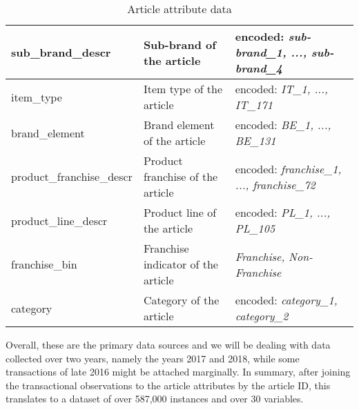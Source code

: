 \begin{table}[H]
\begin{adjustbox}{max width=\textwidth}
\begin{tabular}{|l|l|l|}
sub\_brand\_descr         & Sub-brand of the article                               & encoded: \textit{sub-brand\_1, ..., sub-brand\_4 }     \\ \hline
item\_type                & Item type of the article                               & encoded: \textit{IT\_1, ..., IT\_171 }                 \\ \hline
brand\_element            & Brand element of the article                           & encoded: \textit{BE\_1, ..., BE\_131 }                   \\ \hline
product\_franchise\_descr & Product franchise of the article                       & encoded: \textit{franchise\_1, ..., franchise\_72}     \\ \hline
product\_line\_descr      & Product line of the article                            & encoded: \textit{PL\_1, ..., PL\_105 }                 \\ \hline
franchise\_bin            & Franchise indicator of the article                     &\textit{Franchise, Non-Franchise }                     \\ \hline
category                  & Category of the article                                & encoded: \textit{category\_1, category\_2}             \\ \hline
\end{tabular}
\end{adjustbox}
\caption{Article attribute data}
\label{tab:article_master_data}
\end{table}

Overall, these are the primary data sources and we will be dealing with data collected over two years, namely the years 2017 and 2018, while some transactions of late 2016 might be attached marginally. In summary, after joining the transactional observations to the article attributes by the article ID, this translates to a dataset of over 587,000 instances and over 30 variables. 

